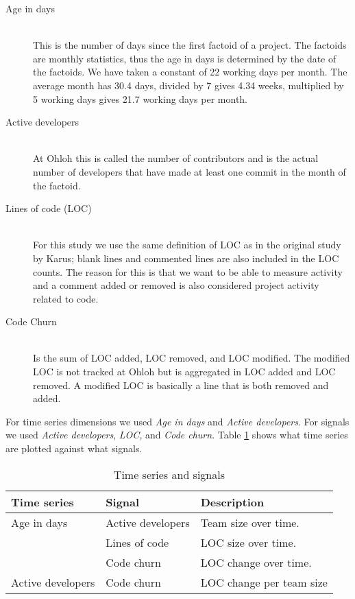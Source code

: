 \begin{description}
	\item[Age in days] \hfill \\
		This is the number of days since the first factoid of a project. The factoids
		are monthly statistics, thus the age in days is determined by the date of the
		factoids. We have taken a constant of 22 working days per month. The average
		month has 30.4 days, divided by 7 gives 4.34 weeks, multiplied by 5 working
		days gives 21.7 working days per month.

	\item[Active developers] \hfill \\
		At Ohloh this is called the number of contributors and is the actual number of
		developers that have made at least one commit in the month of the factoid.
	
	\item[Lines of code (LOC)] \hfill \\
		For this study we use the same definition of LOC as in the original study by
		Karus; blank lines and commented lines are also included in the LOC counts.
		The reason for this is that we want to be able to measure activity and a
		comment added or removed is also considered project activity related to code.

	\item[Code Churn] \hfill \\
		Is the sum of LOC added, LOC removed, and LOC modified. The modified LOC is
		not tracked at Ohloh but is aggregated in LOC added and LOC removed. A
		modified LOC is basically a line that is both removed and added.

\end{description}

\noindent
For time series dimensions we used \emph{Age in days }\rm and \emph{Active
developers}\rm. For signals we used \emph{Active developers}\rm, \emph{LOC}\rm,
and \emph{Code churn}. Table \ref{tab:series} shows what time series are
plotted against what signals.

\begin{table}
\centering
	\caption{Time series and signals}
	\begin{tabular}{| p{4cm} | p{4cm} | p{4cm} |}
	\hline
	Time series & Signal & Description \\ \hline
	Age in days & Active developers & Team size over time. \\
				& Lines of code & LOC size over time. \\
				& Code churn & LOC change over time. \\ \hline
	Active developers & Code churn & LOC change per team size \\ \hline
	\end{tabular}
\label{tab:series}
\end{table}

